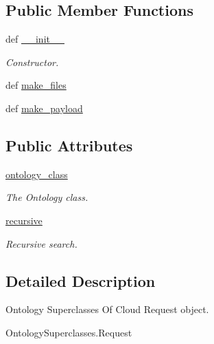 \subsection*{Public Member Functions}
\begin{DoxyCompactItemize}
\item 
def \hyperlink{classRappCloud_1_1CloudMsgs_1_1OntologySuperclasses_1_1OntologySuperclasses_1_1Request_ab1b6a224e5c764b6e371ebc34587097f}{\-\_\-\-\_\-init\-\_\-\-\_\-}
\begin{DoxyCompactList}\small\item\em Constructor. \end{DoxyCompactList}\item 
def \hyperlink{classRappCloud_1_1CloudMsgs_1_1OntologySuperclasses_1_1OntologySuperclasses_1_1Request_a13a021b51716e5e83a1e72aea1203e6a}{make\-\_\-files}
\item 
def \hyperlink{classRappCloud_1_1CloudMsgs_1_1OntologySuperclasses_1_1OntologySuperclasses_1_1Request_a16ea1f31e9d168b23c7da3fe9d349827}{make\-\_\-payload}
\end{DoxyCompactItemize}
\subsection*{Public Attributes}
\begin{DoxyCompactItemize}
\item 
\hyperlink{classRappCloud_1_1CloudMsgs_1_1OntologySuperclasses_1_1OntologySuperclasses_1_1Request_a6a65c01ddc46f07ed84911d3612355ad}{ontology\-\_\-class}
\begin{DoxyCompactList}\small\item\em The Ontology class. \end{DoxyCompactList}\item 
\hyperlink{classRappCloud_1_1CloudMsgs_1_1OntologySuperclasses_1_1OntologySuperclasses_1_1Request_a7f6046aa8399d9537e300efa49e0fe0f}{recursive}
\begin{DoxyCompactList}\small\item\em Recursive search. \end{DoxyCompactList}\end{DoxyCompactItemize}


\subsection{Detailed Description}
\begin{DoxyVerb}Ontology Superclasses Of Cloud Request object.

OntologySuperclasses.Request
\end{DoxyVerb}
 

